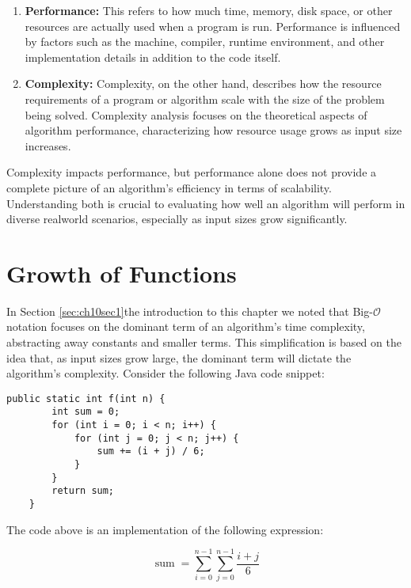 \begin{enumerate}
    \item \textbf{Performance:} This refers to how much time, memory, disk space, or other resources are actually used when a program is run. Performance is influenced by factors such as the machine, compiler, runtime environment, and other implementation details in addition to the code itself.
    \item \textbf{Complexity:} Complexity, on the other hand, describes how the resource requirements of a program or algorithm scale with the size of the problem being solved. Complexity analysis focuses on the theoretical aspects of algorithm performance, characterizing how resource usage grows as input size increases.
\end{enumerate}

Complexity impacts performance, but performance alone does not provide a complete picture of an algorithm's efficiency in terms of scalability. Understanding both is crucial to evaluating how well an algorithm will perform in diverse realworld scenarios, especially as input sizes grow significantly.

\section{Growth of Functions}
In Section \ref{sec:ch10sec1}the introduction to this chapter we noted that Big-$\mathcal{O}$ notation focuses on the dominant term of an algorithm's time complexity, abstracting away constants and smaller terms. This simplification is based on the idea that, as input sizes grow large, the dominant term will dictate the algorithm's complexity. Consider the following Java code snippet:

\newpage

\begin{lstlisting}[style=javaStyle, caption={Java SumCalculator}, label={lst:java_f_function}]
    public static int f(int n) {
        int sum = 0;
        for (int i = 0; i < n; i++) {
            for (int j = 0; j < n; j++) {
                sum += (i + j) / 6;
            }
        }
        return sum;
    }
\end{lstlisting}

The code above is an implementation of the following expression:

\[
\operatorname{sum}=\sum_{i=0}^{n-1} \sum_{j=0}^{n-1} \frac{i+j}{6}
\]

